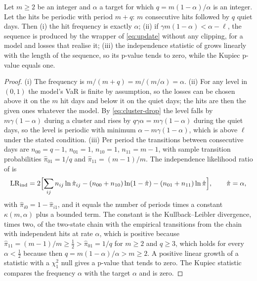 \begin{proposition}
\label{prop:independence}
Let $m \ge 2$ be an integer and $\alpha$ a target for which $q = m(1-\alpha)/\alpha$ is an integer. Let the hits be periodic with period $m + q$: $m$ consecutive hits followed by $q$ quiet days. Then (i) the hit frequency is exactly $\alpha$; (ii) if $\gamma m (1-\alpha) < \alpha - \ell$, the sequence is produced by the wrapper of \cref{eq:update} without any clipping, for a model and losses that realise it; (iii) the independence statistic of \citet{christoffersen1998} grows linearly with the length of the sequence, so its p-value tends to zero, while the Kupiec p-value equals one.
\end{proposition}
\begin{proof}
(i) The frequency is $m/(m+q) = m/(m/\alpha) = \alpha$. (ii) For any level in $(0,1)$ the model's VaR is finite by assumption, so the losses can be chosen above it on the $m$ hit days and below it on the quiet days; the hits are then the given ones whatever the model. By \cref{eq:cluster-drop} the level falls by $m\gamma(1-\alpha)$ during a cluster and rises by $q\gamma\alpha = m\gamma(1-\alpha)$ during the quiet days, so the level is periodic with minimum $\alpha - m\gamma(1-\alpha)$, which is above $\ell$ under the stated condition. (iii) Per period the transitions between consecutive days are $n_{00} = q - 1$, $n_{01} = 1$, $n_{10} = 1$, $n_{11} = m - 1$, with sample transition probabilities $\hat\pi_{01} = 1/q$ and $\hat\pi_{11} = (m-1)/m$. The independence likelihood ratio of \citet{christoffersen1998} is
\begin{equation}
\mathrm{LR}_{\mathrm{ind}} = 2\Bigl[\sum_{ij} n_{ij}\ln\hat\pi_{ij} - (n_{00}+n_{10})\ln(1-\hat\pi) - (n_{01}+n_{11})\ln\hat\pi\Bigr], \qquad \hat\pi = \alpha,
\label{eq:lr-ind}
\end{equation}
with $\hat\pi_{i0} = 1 - \hat\pi_{i1}$, and it equals the number of periods times a constant $\kappa(m,\alpha)$ plus a bounded term. The constant is the Kullback--Leibler divergence, times two, of the two-state chain with the empirical transitions from the chain with independent hits at rate $\alpha$, which is positive because $\hat\pi_{11} = (m-1)/m \ge \tfrac12 > \hat\pi_{01} = 1/q$ for $m \ge 2$ and $q \ge 3$, which holds for every $\alpha < \tfrac12$ because then $q = m(1-\alpha)/\alpha > m \ge 2$. A positive linear growth of a statistic with a $\chi^2_1$ null gives a p-value that tends to zero. The Kupiec statistic compares the frequency $\alpha$ with the target $\alpha$ and is zero.
\end{proof}

